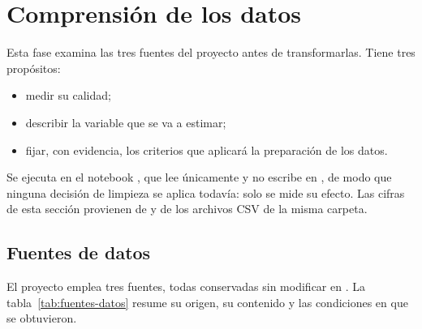 \section{Comprensión de los datos}
\label{sec:comprension-datos}

Esta fase examina las tres fuentes del proyecto antes de transformarlas. Tiene tres
propósitos:
\begin{itemize}
  \item medir su calidad;
  \item describir la variable que se va a estimar;
  \item fijar, con evidencia, los criterios que aplicará la preparación de los datos.
\end{itemize}
Se ejecuta en el notebook , que lee únicamente  y no escribe en
, de modo que ninguna decisión de limpieza se aplica todavía: solo se mide su
efecto. Las cifras de esta sección provienen de  y de
los archivos CSV de la misma carpeta.

\subsection{Fuentes de datos}
\label{sec:fuentes-datos}

El proyecto emplea tres fuentes, todas conservadas sin modificar en . La
tabla~\ref{tab:fuentes-datos} resume su origen, su contenido y las condiciones en que se
obtuvieron.

